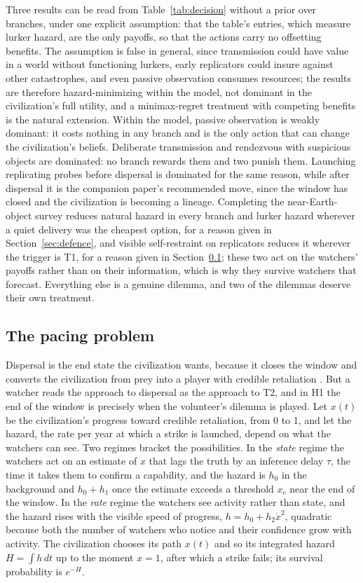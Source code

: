 \documentclass[preprint,12pt]{elsarticle}
\theoremstyle{definition}
\begin{document}
Three results can be read from Table~\ref{tab:decision} without a prior over branches, under one explicit assumption: that the table's entries, which measure lurker hazard, are the only payoffs, so that the actions carry no offsetting benefits. The assumption is false in general, since transmission could have value in a world without functioning lurkers, early replicators could insure against other catastrophes, and even passive observation consumes resources; the results are therefore hazard-minimizing within the model, not dominant in the civilization's full utility, and a minimax-regret treatment with competing benefits is the natural extension. Within the model, passive observation is weakly dominant: it costs nothing in any branch and is the only action that can change the civilization's beliefs. Deliberate transmission and rendezvous with suspicious objects are dominated: no branch rewards them and two punish them. Launching replicating probes before dispersal is dominated for the same reason, while after dispersal it is the companion paper's recommended move, since the window has closed and the civilization is becoming a lineage. Completing the near-Earth-object survey reduces natural hazard in every branch and lurker hazard wherever a quiet delivery was the cheapest option, for a reason given in Section~\ref{sec:defence}, and visible self-restraint on replicators reduces it wherever the trigger is T1, for a reason given in Section~\ref{sec:pacing}; these two act on the watchers' payoffs rather than on their information, which is why they survive watchers that forecast. Everything else is a genuine dilemma, and two of the dilemmas deserve their own treatment.

\subsection{The pacing problem}
\label{sec:pacing}

Dispersal is the end state the civilization wants, because it closes the window and converts the civilization from prey into a player with credible retaliation \citep{Korhonen2013}. But a watcher reads the approach to dispersal as the approach to T2, and in H1 the end of the window is precisely when the volunteer's dilemma is played. Let $x(t)$ be the civilization's progress toward credible retaliation, from 0 to 1, and let the hazard, the rate per year at which a strike is launched, depend on what the watchers can see. Two regimes bracket the possibilities. In the \emph{state} regime the watchers act on an estimate of $x$ that lags the truth by an inference delay $\tau$, the time it takes them to confirm a capability, and the hazard is $h_0$ in the background and $h_0 + h_1$ once the estimate exceeds a threshold $x_c$ near the end of the window. In the \emph{rate} regime the watchers see activity rather than state, and the hazard rises with the visible speed of progress, $h = h_0 + h_2 \dot{x}^{2}$, quadratic because both the number of watchers who notice and their confidence grow with activity. The civilization chooses its path $x(t)$ and so its integrated hazard $H = \int h\,dt$ up to the moment $x = 1$, after which a strike fails; its survival probability is $e^{-H}$.
\end{document}
